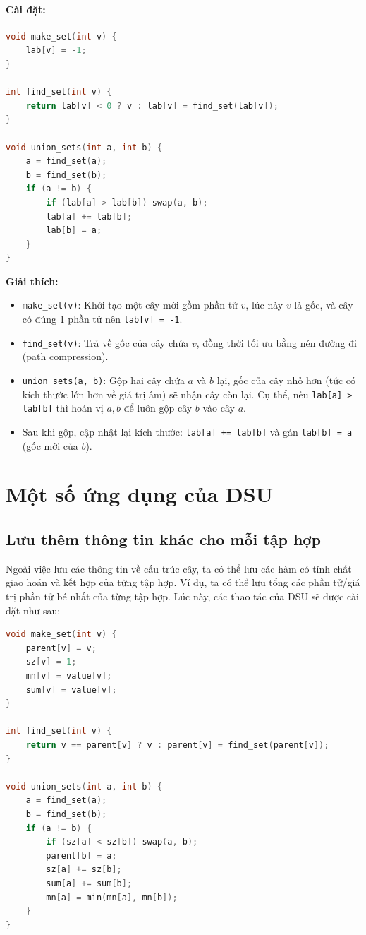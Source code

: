 \paragraph{Cài đặt:}
\begin{lstlisting}[language=C++]
void make_set(int v) {
    lab[v] = -1;
}

int find_set(int v) {
    return lab[v] < 0 ? v : lab[v] = find_set(lab[v]);
}

void union_sets(int a, int b) {
    a = find_set(a);
    b = find_set(b);
    if (a != b) {
        if (lab[a] > lab[b]) swap(a, b);
        lab[a] += lab[b];
        lab[b] = a;
    }
}
\end{lstlisting}

\textbf{Giải thích:}
\begin{itemize}
    \item \texttt{make\_set(v)}: Khởi tạo một cây mới gồm phần tử $v$, lúc này $v$ là gốc, và cây có đúng 1 phần tử nên \texttt{lab[v] = -1}.
    \item \texttt{find\_set(v)}: Trả về gốc của cây chứa $v$, đồng thời tối ưu bằng nén đường đi (path compression).
    \item \texttt{union\_sets(a, b)}: Gộp hai cây chứa $a$ và $b$ lại, gốc của cây nhỏ hơn (tức có kích thước lớn hơn về giá trị âm) sẽ nhận cây còn lại. Cụ thể, nếu \texttt{lab[a] > lab[b]} thì hoán vị $a, b$ để luôn gộp cây $b$ vào cây $a$.
    \item Sau khi gộp, cập nhật lại kích thước: \texttt{lab[a] += lab[b]} và gán \texttt{lab[b] = a} (gốc mới của $b$).
\end{itemize}

\section{Một số ứng dụng của DSU}

\subsection*{Lưu thêm thông tin khác cho mỗi tập hợp}

Ngoài việc lưu các thông tin về cấu trúc cây, ta có thể lưu các hàm có tính chất giao hoán và kết hợp của từng tập hợp. Ví dụ, ta có thể lưu tổng các phần tử/giá trị phần tử bé nhất của từng tập hợp. Lúc này, các thao tác của DSU sẽ được cài đặt như sau:

\begin{lstlisting}[language=C++]
void make_set(int v) {
    parent[v] = v;
    sz[v] = 1;
    mn[v] = value[v];
    sum[v] = value[v];
}

int find_set(int v) {
    return v == parent[v] ? v : parent[v] = find_set(parent[v]);
}

void union_sets(int a, int b) {
    a = find_set(a);
    b = find_set(b);
    if (a != b) {
        if (sz[a] < sz[b]) swap(a, b);
        parent[b] = a;
        sz[a] += sz[b];
        sum[a] += sum[b];
        mn[a] = min(mn[a], mn[b]);
    }
}
\end{lstlisting}

